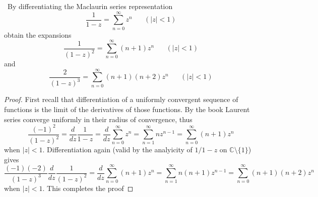 \documentclass[11pt]{amsart}
\theoremstyle{definition}
\numberwithin{theorem}{section}
\numberwithin{definition}{section}
\numberwithin{equation}{section}
\begin{document}
 \medskip {}\ By differentiating the Maclaurin series representation
 \begin{equation*}
 \frac{1}{1 - z} = \sum_{n=0}^\infty z^n \;\;\;\;\;\;(|z| < 1)
 \end{equation*}
 obtain the expansions 
 \begin{equation*}
 	\frac{1}{(1-z)^2} = \sum_{n=0}^\infty (n+1)z^n \;\;\;\;\;\;(|z| < 1)
 \end{equation*} and 
 \begin{equation*}
 	\frac{2}{(1-z)^3} = \sum_{n=0}^\infty (n+1)(n+2)z^n \;\;\;\;\;\;(|z| < 1)
 \end{equation*}
 \begin{proof}
 	First recall that differentiation of a uniformly convergent sequence of functions is the limit of the derivatives of those functions. By the book Laurent series converge uniformly in their radius of convergence, thus
 	\begin{equation*}
 	\frac{(-1)^2}{(1-z)^2}= \frac{d}{dz}	\frac{1}{1-z} =\frac{d}{dz} \sum_{n=0}^\infty z^n = \sum_{n=1}^\infty n z^{n-1} = \sum_{n=0}^\infty (n+1) z^n
 	\end{equation*}
 	when $|z| < 1$. Differentiation again (valid by the analyicity of $1/1-z$ on $\mathbb{C} \setminus \{1\}$) gives 
 	\begin{equation*}
 		\frac{(-1)(-2)}{(1-z)^3} \frac{d}{dz} \frac{1}{(1-z)^2} = \frac{d}{dz} \sum_{n=0}^\infty (n+1) z^n = \sum_{n=1}^\infty n(n+1) z^{n-1} = \sum_{n=0}^\infty (n+1)(n+2) z^{n}
 	\end{equation*}
 	when $|z| < 1$. This completes the proof
 \end{proof}
\end{document}
